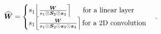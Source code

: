 \documentclass{article}
\theoremstyle{plain}
\theoremstyle{definition}
\theoremstyle{remark}
\begin{document}
\begin{equation}
    \widehat{{\bm{W}}} = 
    \begin{cases}
    s_1 \Big\lfloor {{\bm{W}}\over {s_1 \odot {\bm{S}}_2 \odot {\bm{s}}_3}} \Big\rceil \quad\,\, \text{ for a linear layer} \\
    s_1 \Big\lfloor {{\bm{W}}\over {s_1 \odot {\bm{S}}_2 \odot {\bm{s}}_3 \odot {\bm{s}}_4}} \Big\rceil \,\text{for a 2D convolution} 
    \end{cases}\label{eq:flexround2}.
\end{equation}
\end{document}
